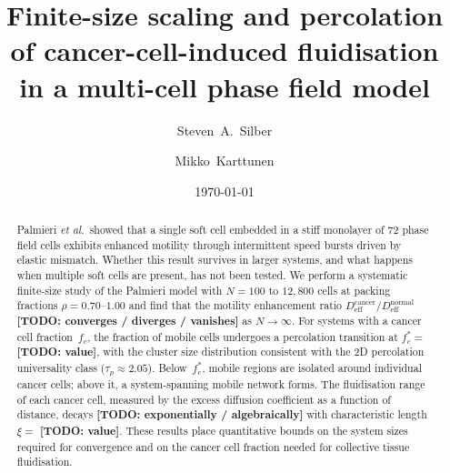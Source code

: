 \documentclass[aps,pre,twocolumn,superscriptaddress,longbibliography,floatfix]{revtex4-2}
\newcommand{\Deff}{D_{\mathrm{eff}}}       %
\newcommand{\fc}{f_c}                      %
\newcommand{\TODO}[1]{{\color{red}\textbf{[TODO: #1]}}}
\begin{document}
\title{Finite-size scaling and percolation of cancer-cell-induced
fluidisation in a multi-cell phase field model}

\author{Steven~A.~Silber}

\author{Mikko~Karttunen}

\date{\today}

\begin{abstract}
Palmieri \textit{et al.}\ showed that a single soft cell embedded in a
stiff monolayer of 72 phase field cells exhibits enhanced motility
through intermittent speed bursts driven by elastic mismatch.  Whether
this result survives in larger systems, and what happens when multiple
soft cells are present, has not been tested.  We perform a systematic
finite-size study of the Palmieri model with $N = 100$ to $12{,}800$
cells at packing fractions $\rho = 0.70$--$1.00$ and find that the
motility enhancement ratio $\Deff^{\mathrm{cancer}} /
\Deff^{\mathrm{normal}}$ \TODO{converges / diverges / vanishes} as
$N \to \infty$.  For systems with a cancer cell fraction~$\fc$, the
fraction of mobile cells undergoes a percolation transition at
$\fc^* = $ \TODO{value}, with the cluster size distribution consistent
with the 2D percolation universality class ($\tau_p \approx 2.05$).
Below~$\fc^*$, mobile regions are isolated around individual cancer
cells; above it, a system-spanning mobile network forms.  The
fluidisation range of each cancer cell, measured by the excess
diffusion coefficient as a function of distance, decays
\TODO{exponentially / algebraically} with characteristic length
$\xi = $ \TODO{value}.  These results place quantitative bounds on the
system sizes required for convergence and on the cancer cell fraction
needed for collective tissue fluidisation.
\end{abstract}

\maketitle
\end{document}
